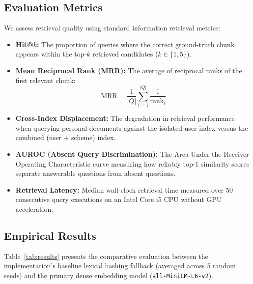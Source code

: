 \documentclass[conference]{IEEEtran}
\begin{document}
\subsection{Evaluation Metrics}
We assess retrieval quality using standard information retrieval metrics:
\begin{itemize}
    \item \textbf{Hit@$k$:} The proportion of queries where the correct ground-truth chunk appears within the top-$k$ retrieved candidates ($k \in \{1, 5\}$).
    \item \textbf{Mean Reciprocal Rank (MRR):} The average of reciprocal ranks of the first relevant chunk:
    \begin{equation}
    \mathrm{MRR} = \frac{1}{|Q|} \sum_{i=1}^{|Q|} \frac{1}{\mathrm{rank}_i}
    \end{equation}
    \item \textbf{Cross-Index Displacement:} The degradation in retrieval performance when querying personal documents against the isolated user index versus the combined (user + scheme) index.
    \item \textbf{AUROC (Absent Query Discrimination):} The Area Under the Receiver Operating Characteristic curve measuring how reliably top-1 similarity scores separate answerable questions from absent questions.
    \item \textbf{Retrieval Latency:} Median wall-clock retrieval time measured over 50 consecutive query executions on an Intel Core i5 CPU without GPU acceleration.
\end{itemize}

\subsection{Empirical Results}
Table~\ref{tab:results} presents the comparative evaluation between the implementation's baseline lexical hashing fallback (averaged across 5 random seeds) and the primary dense embedding model (\texttt{all-MiniLM-L6-v2}).
\end{document}
